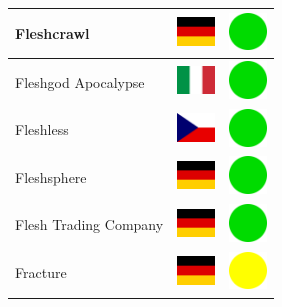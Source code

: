 \documentclass[12pt, a4paper, twoside]{report}
\begin{document}
\begin{center}
\begin{longtable}{|p{5cm}|p{2cm}|p{2cm}|}
 Fleshcrawl                                                 & \includegraphics[width=1cm]{../4x3/de} &   \includegraphics[width=1cm]{../likes/y} \\ \hline
 Fleshgod Apocalypse                                        & \includegraphics[width=1cm]{../4x3/it} &   \includegraphics[width=1cm]{../likes/y} \\ \hline
 Fleshless                                                  & \includegraphics[width=1cm]{../4x3/cz} &   \includegraphics[width=1cm]{../likes/y} \\ \hline
 Fleshsphere                                                & \includegraphics[width=1cm]{../4x3/de} &   \includegraphics[width=1cm]{../likes/y} \\ \hline
 Flesh Trading Company                                      & \includegraphics[width=1cm]{../4x3/de} &   \includegraphics[width=1cm]{../likes/y} \\ \hline
 Fracture                                                   & \includegraphics[width=1cm]{../4x3/de} &   \includegraphics[width=1cm]{../likes/m} \\ \hline

\end{longtable}
\end{center}
\end{document}
